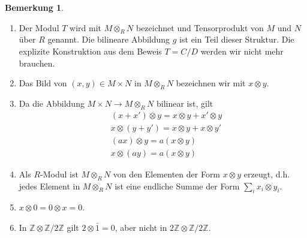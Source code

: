 \documentclass[reqno,12pt]{article}
\numberwithin{equation}{section}
\newcommand{\bZ}{\mathbb{Z}}
\theoremstyle{plain}
\theoremstyle{definition}
\newtheorem{remark}[thm]{Bemerkung}
\begin{document}
\begin{remark}
\
\begin{enumerate}
\item Der Modul $T$ wird mit $M \otimes_R N$ bezeichnet und {\sf Tensorprodukt} von $M$ und $N$ über $R$ genannt. Die bilineare Abbildung $g$ ist ein Teil dieser Struktur. Die explizite Konstruktion aus dem Beweis $T=C/D$ werden wir nicht mehr brauchen.

\item Das Bild von $(x,y) \in M \times N$ in $M \otimes_R N$ bezeichnen wir mit $x \otimes y$.

\item Da die Abbildung $M \times N \to M \otimes_R N$ bilinear ist, gilt
\begin{align*}
& (x+x') \otimes y = x \otimes y + x' \otimes y \\
& x \otimes (y+y') = x \otimes y + x \otimes y' \\
& (ax) \otimes y = a (x \otimes y) \\
& x \otimes (ay) = a (x \otimes y)
\end{align*}

\item Als $R$-Modul ist $M \otimes_R N$ von den Elementen der Form $x \otimes y$ erzeugt, d.h. jedes Element in $M \otimes_R N$ ist eine endliche Summe der Form $\sum_i x_i \otimes y_i$.

\item $x \otimes 0 = 0 \otimes x =0$.

\item In $\bZ \otimes \bZ / 2 \bZ$ gilt $2 \otimes \bar{1} = 0$, aber nicht in $2\bZ \otimes \bZ / 2 \bZ$.

\end{enumerate}
\end{remark}
\end{document}
